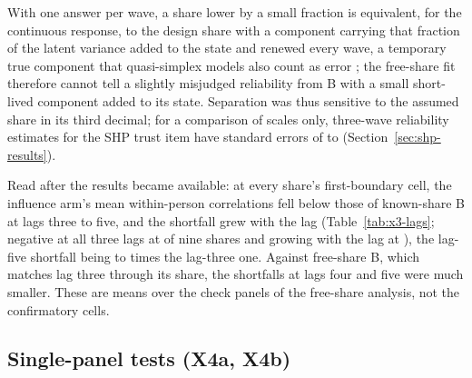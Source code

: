 With one answer per wave, a share lower by a small fraction is equivalent, for the continuous response, to the design share with a component carrying that fraction of the latent variance added to the state and renewed every wave, a temporary true component that quasi-simplex models also count as error \cite[p.~183]{saris2014}; the free-share fit therefore cannot tell a slightly misjudged reliability from B with a small short-lived component added to its state. Separation was thus sensitive to the assumed share in its third decimal; for a comparison of scales only, three-wave reliability estimates for the SHP trust item have standard errors of  to  (Section~\ref{sec:shp-results}).





Read after the results became available: at every share's first-boundary cell, the influence arm's mean within-person correlations fell below those of known-share B at lags three to five, and the shortfall grew with the lag (Table~\ref{tab:x3-lags}; negative at all three lags at  of nine shares and growing with the lag at ), the lag-five shortfall being  to  times the lag-three one. Against free-share B, which matches lag three through its share, the shortfalls at lags four and five were much smaller. These are means over the check panels of the free-share analysis, not the confirmatory cells.



\clearpage

\subsection{Single-panel tests (X4a, X4b)}\label{sec:x4}

